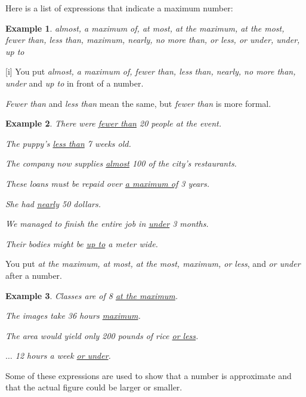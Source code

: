 \documentclass[oneside]{book}
\numberwithin{equation}{section}
\newtheorem{example}{Example}[section]
\begin{document}
%
Here is a list of expressions that indicate a maximum number:
\begin{example}
    almost, a maximum of, at most, at the maximum, at the most, fewer than, less than, maximum, nearly, no more than, or less, or under, under, up to
\end{example}
%
\noindent{} [i] You put \textit{almost, a maximum of, fewer than, less than, nearly, no more than, under} and \textit{up to} in front of a number.

%
\textit{Fewer than} and \textit{less than} mean the same, but \textit{fewer than} is more formal.
\begin{example}
    There were \underline{fewer than} 20 people at the event.
    
    The puppy's \underline{less than} 7 weeks old.
    
    The company now supplies \underline{almost} 100 of the city's restaurants.
    
    These loans must be repaid over \underline{a maximum of} 3 years.
    
    She had \underline{nearly} 50 dollars.
    
    We managed to finish the entire job in \underline{under} 3 months.
    
    Their bodies might be \underline{up to} a meter wide.
\end{example}
You put \textit{at the maximum, at most, at the most, maximum, or less}, and \textit{or under} after a number.
\begin{example}
    Classes are of 8 \underline{at the maximum}.
    
    The images take 36 hours \underline{maximum}.
    
    The area would yield only 200 pounds of rice \underline{or less}.
    
    $\ldots$ 12 hours a week \underline{or under}.
\end{example}
%
\noindent{} Some of these expressions are used to show that a number is approximate and that the actual figure could be larger or smaller.
\end{document}
